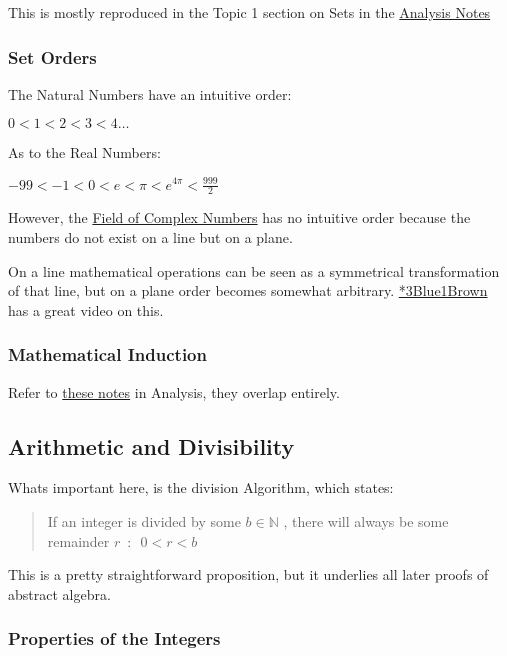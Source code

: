 \documentclass[
]{article}
\begin{document}
This is mostly reproduced in the Topic 1 section on Sets in the
\href{https://ryangreenup.github.io/AnalysisNotes/AnalysisNotes.html\#an(1)sets}{Analysis
Notes}

\hypertarget{header-n28}{%
\subsubsection{Set Orders}\label{header-n28}}

The Natural Numbers have an intuitive order:

\(0<1<2<3<4 \dots\)

As to the Real Numbers:

\(-99<-1<0<e<\pi<e^{4\pi}<\frac{999}{2}\)

However, the \protect\hyperlink{aaux285ux29rings2}{Field of Complex
Numbers} has no intuitive order because the numbers do not exist on a
line but on a plane.

On a line mathematical operations can be seen as a symmetrical
transformation of that line, but on a plane order becomes somewhat
arbitrary.
\href{https://www.youtube.com/watch?v=mvmuCPvRoWQ}{*3Blue1Brown} has a
great video on this.

\hypertarget{header-n35}{%
\subsubsection{Mathematical Induction}\label{header-n35}}

Refer to
\href{https://ryangreenup.github.io/AnalysisNotes/AnalysisNotes.html\#an(1)wop}{these
notes} in Analysis, they overlap entirely.

\hypertarget{header-n37}{%
\subsection{Arithmetic and Divisibility}\label{header-n37}}

Whats important here, is the division Algorithm, which states:

\begin{quote}
If an integer is divided by some \(b \in \mathbb{N} \) , there will
always be some remainder \(r \enspace : \enspace 0<r<b\)
\end{quote}

This is a pretty straightforward proposition, but it underlies all later
proofs of abstract algebra.

\hypertarget{header-n43}{%
\subsubsection{Properties of the Integers}\label{header-n43}}
\end{document}
